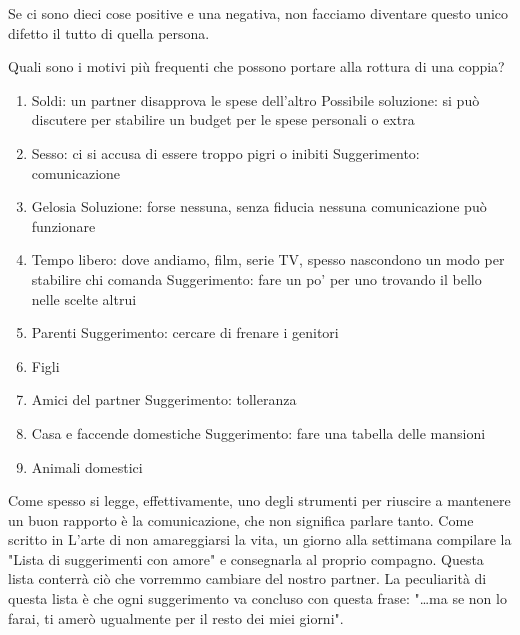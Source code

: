 \documentclass[12pt]{book} %
\begin{document}
Se ci sono dieci cose positive e una negativa, non facciamo diventare questo unico difetto il tutto di quella persona.

Quali sono i motivi più frequenti che possono portare alla rottura di una coppia?

\begin{enumerate}
\item Soldi: un partner disapprova le spese dell'altro\newline
Possibile soluzione: si può discutere per stabilire un budget per le spese personali o extra
\item Sesso: ci si accusa di essere troppo pigri o inibiti \newline
Suggerimento: comunicazione
\item Gelosia\newline
Soluzione: forse nessuna, senza fiducia nessuna comunicazione può funzionare
\item Tempo libero: dove andiamo, film, serie TV, spesso nascondono un modo per stabilire chi comanda \newline
Suggerimento: fare un po' per uno trovando il bello nelle scelte altrui
\item Parenti \newline
Suggerimento: cercare di frenare i genitori
\item Figli
\item Amici del partner \newline
Suggerimento: tolleranza
\item Casa e faccende domestiche \newline
Suggerimento: fare una tabella delle mansioni
\item Animali domestici
\end{enumerate}
Come spesso si legge, effettivamente, uno degli strumenti per riuscire a mantenere un buon rapporto è la comunicazione,
che non significa parlare tanto. Come scritto in L'arte di non amareggiarsi la
vita, un giorno alla settimana compilare la "Lista
di suggerimenti con amore" e consegnarla al proprio compagno. Questa lista conterrà ciò che vorremmo cambiare del nostro partner. La peculiarità di questa lista è che ogni suggerimento va concluso con questa
frase: "…ma se non lo farai, ti amerò ugualmente per il resto dei miei giorni". 
\end{document}

